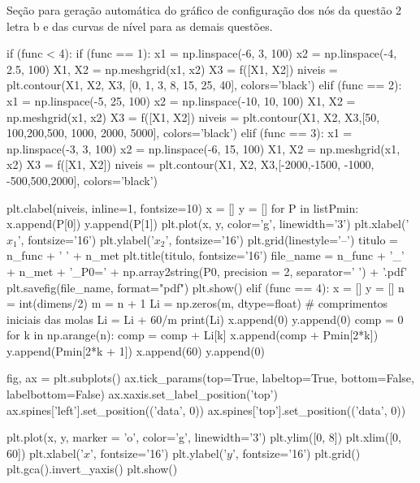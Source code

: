 \documentclass[10pt, a4paper]{article}
\begin{document}
Seção para geração automática do gráfico de configuração dos nós da questão 2 letra b e das curvas de nível para as demais questões.

\begin{python}
  if (func < 4):
    if (func == 1):
        x1 = np.linspace(-6, 3, 100)
        x2 = np.linspace(-4, 2.5, 100)
        X1, X2 = np.meshgrid(x1, x2)
        X3 = f([X1, X2])
        niveis = plt.contour(X1, X2, X3, [0, 1, 3, 8, 15, 25, 40], colors='black')
    elif (func == 2):
        x1 = np.linspace(-5, 25, 100)
        x2 = np.linspace(-10, 10, 100)
        X1, X2 = np.meshgrid(x1, x2)
        X3 = f([X1, X2])
        niveis = plt.contour(X1, X2, X3,[50, 100,200,500, 1000, 2000, 5000], colors='black')
    elif (func == 3):
        x1 = np.linspace(-3, 3, 100)
        x2 = np.linspace(-6, 15, 100)
        X1, X2 = np.meshgrid(x1, x2)
        X3 = f([X1, X2])
        niveis = plt.contour(X1, X2, X3,[-2000,-1500, -1000, -500,500,2000], colors='black')
        
    plt.clabel(niveis, inline=1, fontsize=10)
    x = []
    y = []
    for P in listPmin:
        x.append(P[0])
        y.append(P[1])
    plt.plot(x, y, color='g', linewidth='3')
    plt.xlabel('$x_1$', fontsize='16')
    plt.ylabel('$x_2$', fontsize='16')
    plt.grid(linestyle='--')
    titulo = n_func + ' ' + n_met
    plt.title(titulo, fontsize='16')
    file_name = n_func + '_' + n_met + '_P0=' + np.array2string(P0, precision = 2, separator=' ') + '.pdf'
    plt.savefig(file_name, format="pdf")
    plt.show()
  elif (func == 4):
      x = []
      y = []
      n = int(dimens/2)
      m = n + 1
      Li = np.zeros(m, dtype=float) # comprimentos iniciais das molas
      Li = Li + 60/m
      print(Li)
      x.append(0)
      y.append(0)
      comp = 0
      for k in np.arange(n):
          comp = comp + Li[k]
          x.append(comp + Pmin[2*k])
          y.append(Pmin[2*k + 1])
      x.append(60)
      y.append(0)
      
      fig, ax = plt.subplots()
      ax.tick_params(top=True, labeltop=True, bottom=False, labelbottom=False)
      ax.xaxis.set_label_position('top')
      ax.spines['left'].set_position(('data', 0))
      ax.spines['top'].set_position(('data', 0))

          
      plt.plot(x, y, marker = 'o', color='g', linewidth='3')
      plt.ylim([0, 8])
      plt.xlim([0, 60])
      plt.xlabel('$x$', fontsize='16')
      plt.ylabel('$y$', fontsize='16')
      plt.grid()
      plt.gca().invert_yaxis()
      plt.show()
\end{python}
\end{document}
